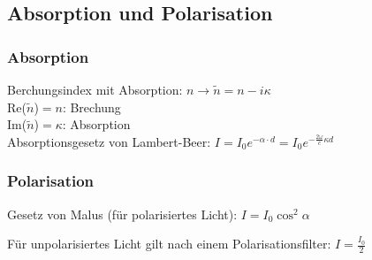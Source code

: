 \documentclass[german]{latex4ei/latex4ei_sheet}
\begin{document}
\subsection{Absorption und Polarisation}
\begin{sectionbox}


\subsubsection{Absorption}
Berchungsindex mit Absorption: $n\rightarrow \tilde{n}=n-i\kappa$\\ 
Re($\tilde{n}$)$=n$: Brechung \\
Im($\tilde{n}$)$=\kappa$: Absorption \\
Absorptionsgesetz von Lambert-Beer: $I=I_0e^{-\alpha \cdot d}=I_0e^{-\frac{2\omega}{c}\kappa d}$

\subsubsection{Polarisation}

Gesetz von Malus (für polarisiertes Licht): $I = I_0 \cos^2 \alpha$

Für unpolarisiertes Licht gilt nach einem Polarisationsfilter: $I = \frac{I_0}{2}$

\end{sectionbox}


\end{document}
